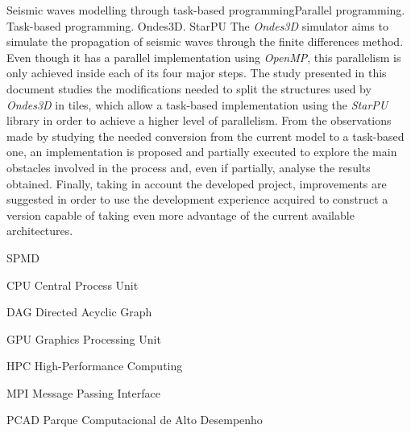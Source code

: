 \documentclass[cic,tc]{iiufrgs}
\begin{document}
\begin{englishabstract}{Seismic waves modelling through task-based programming}{Parallel programming. Task-based programming. Ondes3D. StarPU}
  The \textit{Ondes3D} simulator aims to simulate the propagation of seismic waves through the finite differences method. Even though it has a parallel implementation using
  \textit{OpenMP}, this parallelism is only achieved inside each of its four major steps.
  The study presented in this document studies the modifications needed to split the structures used by \textit{Ondes3D} in tiles, which
  allow a task-based implementation using the \textit{StarPU} library in order to achieve a higher level of parallelism.
  From the observations made by studying the needed conversion from the current model to a task-based one, an implementation is proposed and partially executed to explore
  the main obstacles involved in the process and, even if partially, analyse the results obtained.
  Finally, taking in account the developed project, improvements are suggested in order to use the development experience acquired to construct a version capable of
  taking even more advantage of the current available architectures.
\end{englishabstract}

\listoffigures

\listoftables

\begin{listofabbrv}{SPMD}
\item[CPU] Central Process Unit
\item[DAG] Directed Acyclic Graph
\item[GPU] Graphics Processing Unit
\item[HPC] High-Performance Computing
\item[MPI] Message Passing Interface
\item[PCAD] Parque Computacional de Alto Desempenho
\end{listofabbrv}

\end{document}
